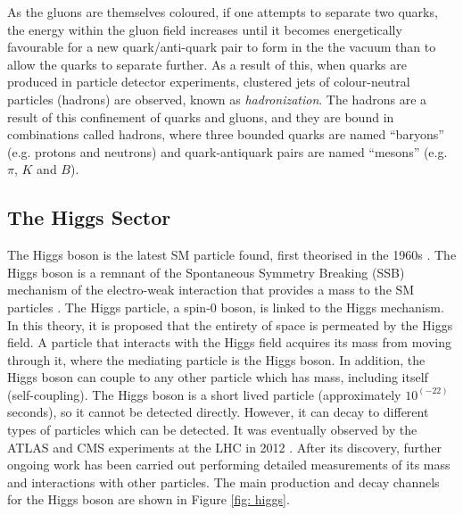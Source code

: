 As the gluons are themselves coloured, if one attempts to separate two quarks, the energy within the gluon field increases until it becomes energetically favourable for a new quark/anti-quark pair to form in the the vacuum than to allow the quarks to separate further. As a result of this, when quarks are produced in particle detector experiments, clustered jets of colour-neutral particles (hadrons) are observed, known as \textit{hadronization}. The hadrons are a result of this confinement of quarks and gluons, and they are bound in combinations called hadrons, where three bounded quarks are named “baryons” (e.g. protons and neutrons) and quark-antiquark pairs are named “mesons” (e.g. $\pi$, $K$ and $B$).





\subsection{The Higgs Sector}

The Higgs boson is the latest SM particle found, first theorised in the 1960s \cite{PhysRevLett.13.321, PhysRevLett.13.508, PhysRevLett.13.585}. The Higgs boson is a remnant of the Spontaneous Symmetry Breaking (SSB) mechanism of the electro-weak interaction that provides a mass to the SM particles \cite{doi:10.1098/rsta.2014.0033}. The Higgs particle, a spin-0 boson, is linked to the Higgs mechanism. In this theory, it is proposed that the entirety of space is permeated by the Higgs field. A particle that interacts with the Higgs field acquires its mass from moving through it, where the mediating particle is the Higgs boson. In addition, the Higgs boson can couple to any other particle which has mass, including itself (self-coupling). The Higgs boson is a short lived particle (approximately $10^(-22)$ seconds), so it cannot be detected directly. However, it can decay to different types of particles which can be detected. It was eventually observed by the ATLAS and CMS experiments at the LHC in 2012 \cite{higgs-20121, higgs-201230}. After its discovery, further ongoing work has been carried out performing detailed measurements of its mass and interactions with other particles. The main production and decay channels for the Higgs boson are shown in Figure \ref{fig: higgs}.

